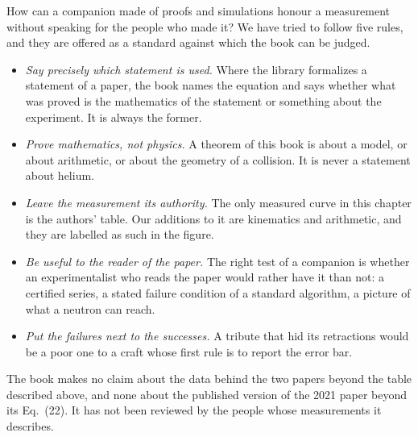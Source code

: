 How can a companion made of proofs and simulations honour a measurement without speaking for the people who made it? We have tried to follow five rules, and they are offered as a standard against which the book can be judged.
\begin{itemize}
\item \emph{Say precisely which statement is used.} Where the library formalizes a statement of a paper, the book names the equation and says whether what was proved is the mathematics of the statement or something about the experiment. It is always the former.
\item \emph{Prove mathematics, not physics.} A theorem of this book is about a model, or about arithmetic, or about the geometry of a collision. It is never a statement about helium.
\item \emph{Leave the measurement its authority.} The only measured curve in this chapter is the authors' table. Our additions to it are kinematics and arithmetic, and they are labelled as such in the figure.
\item \emph{Be useful to the reader of the paper.} The right test of a companion is whether an experimentalist who reads the paper would rather have it than not: a certified series, a stated failure condition of a standard algorithm, a picture of what a neutron can reach.
\item \emph{Put the failures next to the successes.} A tribute that hid its retractions would be a poor one to a craft whose first rule is to report the error bar.
\end{itemize}
The book makes no claim about the data behind the two papers beyond the table described above, and none about the published version of the 2021 paper beyond its Eq.~(22). It has not been reviewed by the people whose measurements it describes.

